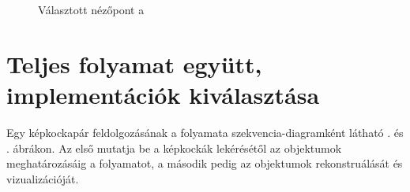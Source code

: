 \begin{figure}[tbh]
\begin{subfigure}[b]{.49\linewidth}
	\caption{}
  \end{subfigure}
\caption{Választott nézőpont a \label{fig:visu_slider}}
\end{figure}

\section{Teljes folyamat együtt, implementációk kiválasztása}

Egy képkockapár feldolgozásának a folyamata szekvencia-diagramként látható . és . ábrákon. Az első mutatja be a képkockák lekérésétől az objektumok meghatározásáig a folyamatot, a második pedig az objektumok rekonstruálását és vizualizációját.

